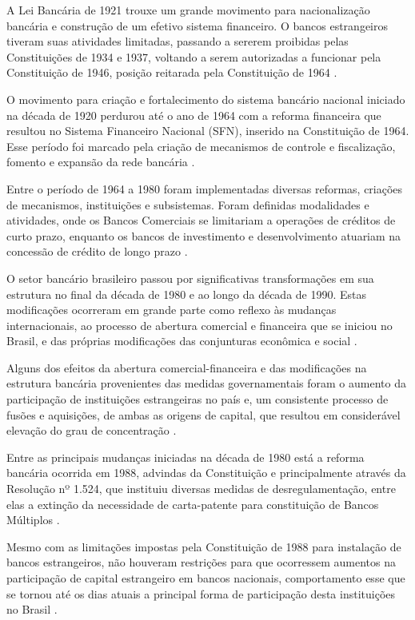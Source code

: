 \documentclass[12pt,12pt,openright,oneside,a4paper,chapter=TITLE,section=TITLE,subsection=TITLE,subsubsection=TITLE,english,french,spanish,portugues,sumario=tradicional]{abntex2}
\begin{document}
A Lei Bancária de 1921 trouxe um grande movimento para nacionalização bancária e construção de um efetivo sistema financeiro. O bancos estrangeiros tiveram suas atividades limitadas, passando a sererem proibidas pelas Constituições de 1934 e 1937, voltando a serem autorizadas a funcionar pela Constituição de 1946, posição reitarada pela Constituição de 1964 \cite{camargo:2009}.

O movimento para criação e fortalecimento do sistema bancário nacional iniciado na década de 1920 perdurou até o ano de 1964 com a reforma financeira que resultou no Sistema Financeiro Nacional (SFN), inserido na Constituição de 1964. Esse período foi marcado pela criação de mecanismos de controle e fiscalização, fomento e expansão da rede bancária \cite{camargo:2009}.

Entre o período de 1964 a 1980 foram implementadas diversas reformas, criações de mecanismos, instituições e subsistemas. Foram definidas modalidades e atividades, onde os Bancos Comerciais se limitariam a operações de créditos de curto prazo, enquanto os bancos de investimento e desenvolvimento atuariam na concessão de crédito de longo prazo \cite{camargo:2009}.

O setor bancário brasileiro passou por significativas transformações em sua estrutura no final da década de 1980 e ao longo da década de 1990. Estas modificações ocorreram em grande parte como reflexo às mudanças internacionais, ao processo de abertura comercial e financeira que se iniciou no Brasil, e das próprias modificações das conjunturas econômica e social \cite{camargo:2009}.

Alguns dos efeitos da abertura comercial-financeira e das modificações na
estrutura bancária provenientes das medidas governamentais foram o aumento da
participação de instituições estrangeiras no país e, um consistente processo de
fusões e aquisições, de ambas as origens de capital, que resultou em
considerável elevação do grau de concentração \cite{camargo:2009}.

Entre as principais mudanças iniciadas na década de 1980 está a reforma bancária ocorrida em 1988, advindas da Constituição e principalmente através da Resolução nº 1.524, que instituiu diversas medidas de desregulamentação, entre elas a extinção da necessidade de carta-patente para constituição de Bancos Múltiplos \cite{Res:1524:1988}.

Mesmo com as limitações impostas pela Constituição de 1988 \cite{constituicao:1988} para instalação de bancos estrangeiros, não houveram restrições para que ocorressem aumentos na participação de capital estrangeiro em bancos nacionais, comportamento esse que se tornou até os dias atuais a principal forma de participação desta instituições no Brasil \cite{camargo:2009}.
\end{document}
